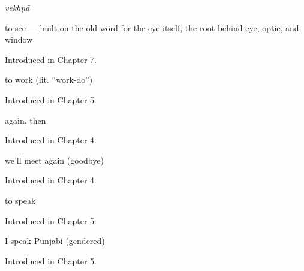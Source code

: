 \noindent\begin{minipage}[t]{\linewidth}
\raggedright
\textbf{}\enspace\emph{vekhṇā}\par
\small to see — built on the old word for the eye itself, the root behind eye, optic, and window\par
\footnotesize Introduced in Chapter 7.
\end{minipage}\par\medskip

\noindent\begin{minipage}[t]{\linewidth}
\raggedright
\textbf{ }\par
\small to work (lit. \textquotedblleft{}work-do\textquotedblright{})\par
\footnotesize Introduced in Chapter 5.
\end{minipage}\par\medskip

\noindent\begin{minipage}[t]{\linewidth}
\raggedright
\textbf{}\par
\small again, then\par
\footnotesize Introduced in Chapter 4.
\end{minipage}\par\medskip

\noindent\begin{minipage}[t]{\linewidth}
\raggedright
\textbf{ }\par
\small we'll meet again (goodbye)\par
\footnotesize Introduced in Chapter 4.
\end{minipage}\par\medskip

\noindent\begin{minipage}[t]{\linewidth}
\raggedright
\textbf{}\par
\small to speak\par
\footnotesize Introduced in Chapter 5.
\end{minipage}\par\medskip

\noindent\begin{minipage}[t]{\linewidth}
\raggedright
\textbf{   }\par
\small I speak Punjabi (gendered)\par
\footnotesize Introduced in Chapter 5.
\end{minipage}\par\medskip

